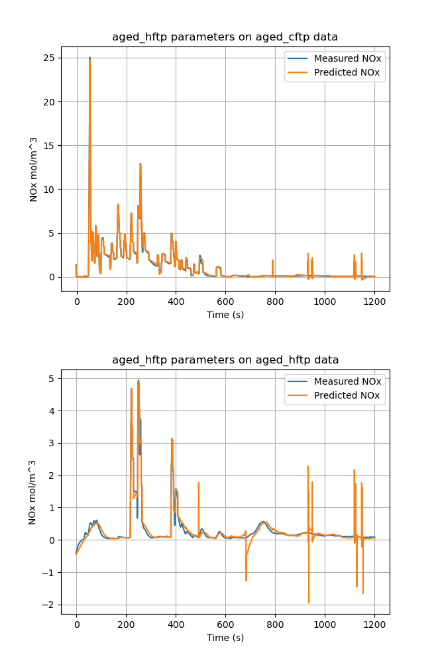 \begin{figure}[H]
        \begin{minipage}{0.33\textwidth}
                \includegraphics[width = \textwidth]{./figs/figs_new_mdl/aged_hftp_aged_cftp.png}
        \end{minipage}
        \begin{minipage}{0.33\textwidth}
                \includegraphics[width = \textwidth]{./figs/figs_new_mdl/aged_hftp_aged_hftp.png}
        \end{minipage}
        \begin{minipage}{0.33\textwidth}

\end{minipage}
\end{figure}
